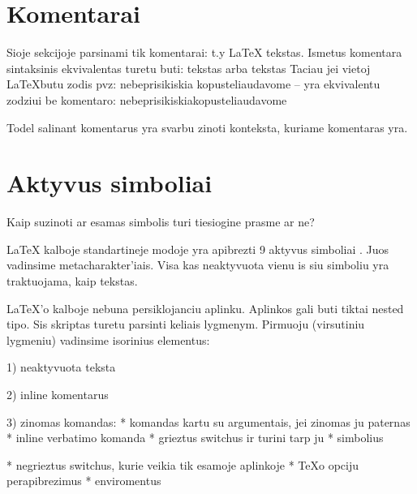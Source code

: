 \documentclass{article}
\begin{document}
\section{Komentarai}


Sioje sekcijoje parsinami tik komentarai:
t.y \LaTeX%
   tekstas. Ismetus komentara sintaksinis ekvivalentas turetu buti: 
\LateX tekstas arba \LateX{}tekstas  
Taciau jei vietoj \LaTeX butu zodis pvz: nebeprisikiskia%
          kopusteliaudavome -- yra ekvivalentu zodziui be komentaro: 
nebeprisikiskiakopusteliaudavome

Todel salinant komentarus yra svarbu zinoti konteksta, kuriame komentaras yra. 

\section{Aktyvus simboliai}

Kaip suzinoti ar esamas simbolis turi tiesiogine prasme ar ne?

LaTeX kalboje standartineje modoje yra apibrezti 9
aktyvus simboliai %
. Juos vadinsime metacharakter'iais. Visa kas neaktyvuota vienu is siu 
simboliu yra traktuojama, kaip tekstas. 

LaTeX'o kalboje nebuna persiklojanciu aplinku. %
Aplinkos gali buti tiktai nested tipo. %
Sis skriptas turetu parsinti keliais lygmenym. Pirmuoju (virsutiniu lygmeniu) 
vadinsime isorinius elementus: 

1) neaktyvuota teksta

2) inline komentarus

3) zinomas komandas:
* komandas kartu su argumentais, jei zinomas ju paternas %
* inline verbatimo komanda %
* grieztus switchus ir turini tarp ju %
* simbolius %

* negrieztus switchus, kurie veikia tik esamoje aplinkoje %
* TeXo opciju perapibrezimus %
* enviromentus
\end{document}
